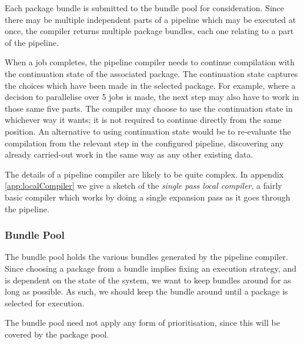 \documentclass[10pt,a4paper]{article}
\newcommand{\npar}{\par\noindent\space}
\begin{document}
\npar Each package bundle is submitted to the bundle pool for consideration. Since there may be multiple independent parts of a pipeline which may be executed at once, the compiler returns multiple package bundles, each one relating to a part of the pipeline.
\npar When a job completes, the pipeline compiler needs to continue compilation with the continuation state of the associated package. The continuation state captures the choices which have been made in the selected package. For example, where a decision to parallelise over 5 jobs is made, the next step may also have to work in those same five parts. The compiler may choose to use the continuation state in whichever way it wants; it is not required to continue directly from the same position. An alternative to using continuation state would be to re-evaluate the compilation from the relevant step in the configured pipeline, discovering any already carried-out work in the same way as any other existing data.
\npar The details of a pipeline compiler are likely to be quite complex. In appendix \ref{app:localCompiler} we give a sketch of the \textit{single pass local compiler}, a fairly basic compiler which works by doing a single expansion pass as it goes through the pipeline.

\subsubsection{Bundle Pool}
\npar The bundle pool holds the various bundles generated by the pipeline compiler. Since choosing a package from a bundle implies fixing an execution strategy, and is dependent on the state of the system, we want to keep bundles around for as long as possible. As such, we should keep the bundle around until a package is selected for execution.
\npar The bundle pool need not apply any form of prioritisation, since this will be covered by the package pool.
\end{document}
